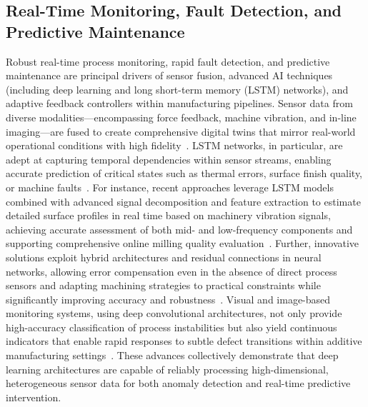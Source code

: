 \documentclass[sigconf]{acmart}
\begin{document}
\subsection{Real-Time Monitoring, Fault Detection, and Predictive Maintenance}

Robust real-time process monitoring, rapid fault detection, and predictive maintenance are principal drivers of sensor fusion, advanced AI techniques (including deep learning and long short-term memory (LSTM) networks), and adaptive feedback controllers within manufacturing pipelines. Sensor data from diverse modalities—encompassing force feedback, machine vibration, and in-line imaging—are fused to create comprehensive digital twins that mirror real-world operational conditions with high fidelity~\cite{ref2, ref5, ref6, ref7, ref15, ref20, ref27, ref44, ref47, ref48, ref58, ref59}. LSTM networks, in particular, are adept at capturing temporal dependencies within sensor streams, enabling accurate prediction of critical states such as thermal errors, surface finish quality, or machine faults~\cite{ref5, ref15, ref48, ref59}. For instance, recent approaches leverage LSTM models combined with advanced signal decomposition and feature extraction to estimate detailed surface profiles in real time based on machinery vibration signals, achieving accurate assessment of both mid- and low-frequency components and supporting comprehensive online milling quality evaluation~\cite{ref48}. Further, innovative solutions exploit hybrid architectures and residual connections in neural networks, allowing error compensation even in the absence of direct process sensors and adapting machining strategies to practical constraints while significantly improving accuracy and robustness~\cite{ref15}. Visual and image-based monitoring systems, using deep convolutional architectures, not only provide high-accuracy classification of process instabilities but also yield continuous indicators that enable rapid responses to subtle defect transitions within additive manufacturing settings~\cite{ref47}. These advances collectively demonstrate that deep learning architectures are capable of reliably processing high-dimensional, heterogeneous sensor data for both anomaly detection and real-time predictive intervention.
\end{document}

